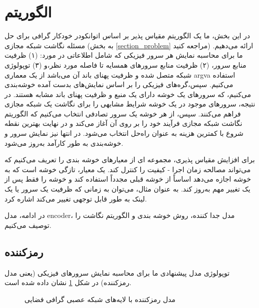 \section{الگوریتم }
در این بخش، ما یک الگوریتم مقیاس پذیر بر اساس اتوانکودر خودکار گرافی برای حل مسئله نگاشت شبکه مجازی  (به بخش \ref {section_problem} مراجعه کنید) ارائه می‌دهیم.
ما برای محاسبه  نمایش هر سرور فیزیکی که شامل اطلاعاتی در مورد: (۱) ظرفیت منابع سرور، (۲) ظرفیت منابع سرورهای همسایه تا فاصله مورد نظر،و (۳)  توپولوژی شبکه متصل شده و ظرفیت پهنای باند آن می‌باشد از یک معماری \gls{argva} استفاده می‌کنیم. سپس،گره‌های فیزیکی را بر اساس نمایش‌های بدست آمده \gls{خوشه‌بندی} می‌کنیم، که سرورهای یک خوشه دارای یک منبع و ظرفیت پهنای باند مشابه هستند. در نتیجه، سرورهای موجود در یک خوشه شرایط مشابهی را برای نگاشت یک شبکه مجازی فراهم می‌کنند. سپس، از هر خوشه یک سرور تصادفی انتخاب می‌کنیم که الگوریتم نگاشت شبکه مجازی فرآیند خود را بر روی آن آغاز می‌کند و در نهایت بهترین نقطه شروع با کمترین هزینه به عنوان راه‌حل انتخاب می‌شود. در انتها نیز نمایش سرور و خوشه‌بندی به طور کارآمد به‌روز می‌شود.


برای افزایش مقیاس پذیری، مجموعه ای از معیارهای خوشه بندی را تعریف می‌کنیم که می‌تواند مصالحه  زمان اجرا - کیفیت را کنترل کند. یک معیار، تازگی خوشه است که به خوشه اجازه می‌دهد اساساً از خوشه قبلی مجدداً استفاده کند و خوشه را فقط پس از یک تغییر مهم به‌روز کند. به عنوان مثال، می‌توان به زمانی که ظرفیت یک سرور یا یک لینک به طور قابل توجهی تغییر می‌کند اشاره کرد.

در ادامه، مدل \gls{encoder}، مدل جدا کننده، روش خوشه بندی و الگوریتم نگاشت را توصیف می‌کنیم.

\subsection{رمزکننده}
توپولوژی مدل پیشنهادی ما برای محاسبه نمایش سرورهای فیزیکی (یعنی مدل رمزکننده) در شکل 
\ref {fig_encoder} 
نشان داده شده است.

\begin{figure}[t]
	\centering
	\caption{مدل رمزکننده با لایه‌های شبکه عصبی گرافی فضایی}
	\label{fig_encoder}
\end{figure}

